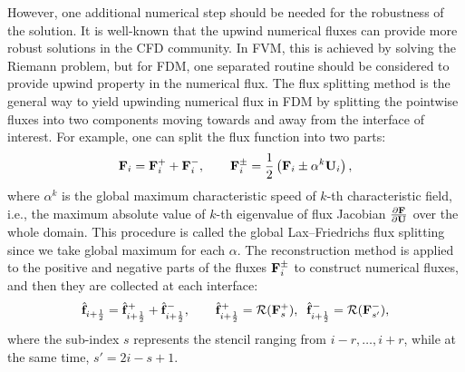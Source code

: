 However, one additional numerical step should be needed for the robustness of the solution.
It is well-known that the upwind numerical fluxes can provide more robust solutions in the CFD community.
In FVM, this is achieved by solving the Riemann problem, but for FDM,
one separated routine should be considered to provide upwind property in the numerical flux.
The flux splitting method is the general way to yield upwinding numerical flux in FDM
by splitting the pointwise fluxes into two components moving towards and away from the interface of interest.
For example, one can split the flux function into two parts:
\begin{equation}\label{eq:lf_splitting}
    \mathbf{F}_{i} = \mathbf{F}^{+}_{i} + \mathbf{F}^{-}_{i}, \qquad \mathbf{F}^{\pm}_{i} = \frac{1}{2} \left( \mathbf{F}_{i} \pm \mathbf{\alpha}^{k} \mathbf{U}_{i} \right),
\end{equation}
where \( \alpha^{k} \) is the global maximum characteristic speed of \( k \)-th characteristic field,
i.e., the maximum absolute value of \( k \)-th eigenvalue of flux Jacobian \( \frac{\partial \mathbf{F}}{\partial \mathbf{U}} \) over the whole domain.
This procedure is called the global Lax–Friedrichs flux splitting~\cite{jiang1996efficient}
since we take global maximum for each \( \alpha \).
The reconstruction method is applied to the positive and negative parts of the fluxes \( \mathbf{F}^{\pm}_{i} \)
to construct numerical fluxes, and then they are collected at each interface:
\begin{equation}\label{eq:lf_splitting_combine}
    \hat{\mathbf{f}}_{{i+\frac{1}{2}}} = \hat{\mathbf{f}}^{+}_{{i+\frac{1}{2}}} + \hat{\mathbf{f}}^{-}_{{i+\frac{1}{2}}},
        \qquad \hat{\mathbf{f}}^{+}_{{i+\frac{1}{2}}} = \mathcal{R}(\mathbf{F}^{+}_{s}),
        \;\; \hat{\mathbf{f}}^{-}_{{i+\frac{1}{2}}} = \mathcal{R}(\mathbf{F}^{-}_{s'}),
\end{equation}
where the sub-index \( s \) represents the stencil ranging from
\( i-r, \dots, i+r \), while at the same time,
\( s' = 2i-s+1 \).

